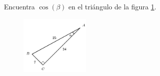 Encuentra $\cos(\beta)$ en el triángulo de la figura \ref{fig:functrig10}.
\begin{figure}[H]
    \begin{center}
        \includegraphics[width=0.3\textwidth]{../images/functrig10.png}
    \end{center}
    \caption{}
    \label{fig:functrig10}
\end{figure}
